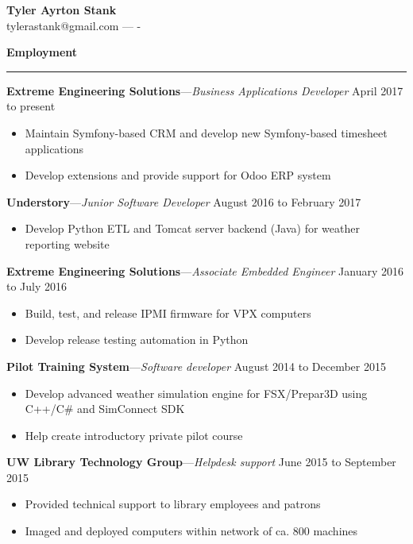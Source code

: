 \documentclass[12pt,letterpaper]{article}
\newenvironment{details}{
    \vspace{-.8em}
    \begin{itemize}
        \renewcommand \labelitemi{\labelitemiv}
        \setlength{\itemsep}{0pt}
        \setlength{\parskip}{-1pt}
        \setlength{\parsep}{0pt}
    }{
    \end{itemize}
    \vspace{-.5em}
}
\newcommand{\hr} {
    \vspace{-1em}
    \par\rule{\textwidth}{1pt}
    \vspace{-1.5em}
}
\newcommand{\ressection}[1] {
    \par{\large \textbf{#1}}
    \hr
}
\newenvironment{employment} {
    \setlength{\parskip}{0pt}
    \ressection{Employment}
}{
    \vspace{0.5em}
}
\newcommand{\employer}[3] {
    \vspace{3pt}
    {\par\textbf{#1}---\textit{#2} \hfill #3}
    \par
}
\begin{document}
\thispagestyle{empty}

\begin{centering}
    {\huge \textbf{Tyler Ayrton Stank}}\\
    tylerastank@gmail.com ---  -\\
\end{centering}


\begin{employment} 

\employer{Extreme Engineering Solutions}{Business Applications Developer}{April 2017 to present}
\begin{details}
    \item Maintain Symfony-based CRM and develop new Symfony-based timesheet applications
    \item Develop extensions and provide support for Odoo ERP system
\end{details}

\employer{Understory}{Junior Software Developer}{August 2016 to February 2017}
\begin{details}
    \item Develop Python ETL and Tomcat server backend (Java) for weather reporting website
\end{details}

\employer{Extreme Engineering Solutions}{Associate Embedded Engineer}{January 2016 to July 2016}
\begin{details}
    \item Build, test, and release IPMI firmware for VPX computers
    \item Develop release testing automation in Python
\end{details}

\employer{Pilot Training System}{Software developer}{August 2014 to December 2015}
\begin{details}
    \item Develop advanced weather simulation engine for FSX/Prepar3D using C++/C\# and SimConnect SDK
    \item Help create introductory private pilot course
\end{details}

\employer{UW Library Technology Group}{Helpdesk support}{June 2015 to September 2015}
\begin{details}
    \item Provided technical support to library employees and patrons
    \item Imaged and deployed computers within network of ca. 800 machines
\end{details}


\end{employment}
\end{document}
